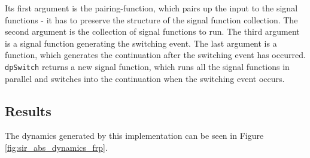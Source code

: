 Its first argument is the pairing-function, which pairs up the input to the signal functions - it has to preserve the structure of the signal function collection. The second argument is the collection of signal functions to run. The third argument is a signal function generating the switching event. The last argument is a function, which generates the continuation after the switching event has occurred. \texttt{dpSwitch} returns a new signal function, which runs all the signal functions in parallel and switches into the continuation when the switching event occurs. %

\subsection{Results}
\label{sub:timedriven_results}

The dynamics generated by this implementation can be seen in Figure \ref{fig:sir_abs_dynamics_frp}. 

